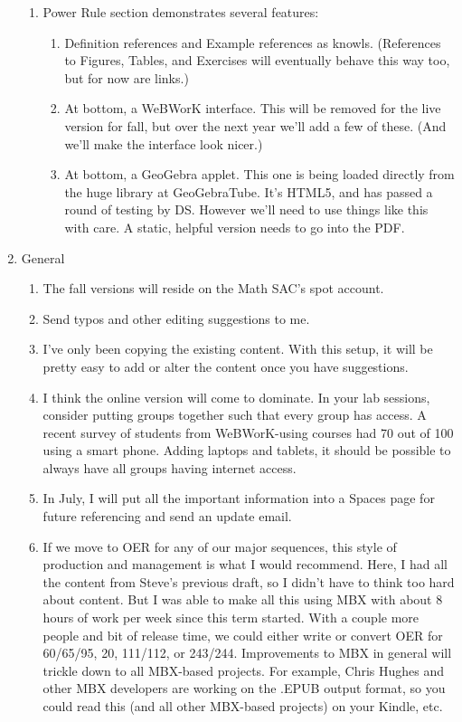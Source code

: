 \documentclass[12pt]{article}
\begin{document}
\begin{enumerate}
\begin{enumerate}
\item Power Rule section demonstrates several features:
\begin{enumerate}
\item Definition references and Example references as knowls. (References to Figures, Tables,  and Exercises will eventually behave this way too, but for now are links.)
\item At bottom, a WeBWorK interface. This will be removed for the live version for fall, but over the next year we'll add a few of these. (And we'll make the interface look nicer.)
\item At bottom, a GeoGebra applet. This one is being loaded directly from the huge library at GeoGebraTube. It's HTML5, and has passed a round of testing by DS. However we'll need to use things like this with care. A static, helpful version needs to go into the PDF. 
\end{enumerate}
\end{enumerate}
\item General
\begin{enumerate}
\item The fall versions will reside on the Math SAC's spot account.
\item Send typos and other editing suggestions to me.
\item I've only been copying the existing content. With this setup, it will be pretty easy to add or alter the content once you have suggestions. 
\item I think the online version will come to dominate. In your lab sessions, consider putting groups together such that every group has access. A recent survey of students from WeBWorK-using courses had 70 out of 100 using a smart phone. Adding laptops and tablets, it should be possible to always have all groups having internet access.
\item In July, I will put all the important information into a Spaces page for future referencing and send an update email.
\item If we move to OER for any of our major sequences, this style of production and management is what I would recommend. Here, I had all the content from Steve's previous draft, so I didn't have to think too hard about content. But I was able to make all this using MBX with about 8 hours of work per week since this term started. With a couple more people and bit of release time, we could either write or convert OER for 60/65/95, 20, 111/112, or 243/244. Improvements to MBX in general will trickle down to all MBX-based projects. For example, Chris Hughes and other MBX developers are working on the .EPUB output format, so you could read this (and all other MBX-based projects) on your Kindle, etc.
\end{enumerate}
\end{enumerate}
\end{document}
